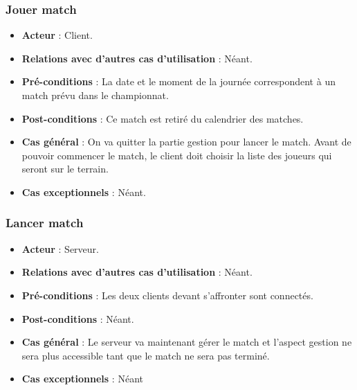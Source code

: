 \documentclass[a4paper,titlepage]{scrreprt}
\begin{document}
    \subsubsection{Jouer match}
      \begin{itemize}
        \item \textbf{Acteur}  : Client.
        \item \textbf{Relations avec d'autres cas d'utilisation}  : Néant.
        \item \textbf{Pré-conditions} : La date et le moment de la journée correspondent à un match prévu dans le championnat.
        \item \textbf{Post-conditions} : Ce match est retiré du \gls{calendrier} des matches.
        \item \textbf{Cas général} : On va quitter la partie gestion pour lancer le match. Avant de pouvoir commencer le match, le client doit choisir la liste des joueurs qui seront sur le terrain. 
        \item \textbf{Cas exceptionnels} : Néant.
      \end{itemize}
    \subsubsection{Lancer match}
      \begin{itemize}
        \item \textbf{Acteur}  : Serveur.
        \item \textbf{Relations avec d'autres cas d'utilisation}  : Néant.
        \item \textbf{Pré-conditions} : Les deux clients devant s'affronter sont connectés.
        \item \textbf{Post-conditions} : Néant.
        \item \textbf{Cas général} : Le serveur va maintenant gérer le match et l’aspect gestion ne sera plus accessible tant que le match ne sera pas terminé.
        \item \textbf{Cas exceptionnels} : Néant
      \end{itemize}
\end{document}
